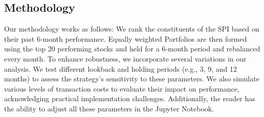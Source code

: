 \documentclass[a4paper,12pt]{article}
\begin{document}
\subsection{Methodology}
Our methodology works as follows: We rank the constituents of the SPI based on their past 6-month performance. Equally weighted Portfolios are then formed using the top 20 performing stocks and held for a 6-month period and rebalanced every month. To enhance robustness, we incorporate several variations in our analysis. We test different lookback and holding periods (e.g., 3, 9, and 12 months) to assess the strategy's sensitivity to these parameters. We also simulate various levels of transaction costs to evaluate their impact on performance, acknowledging practical implementation challenges. Additionally, the reader has the ability to adjust all these parameters in the Jupyter Notebook. 



\newpage

\end{document}
